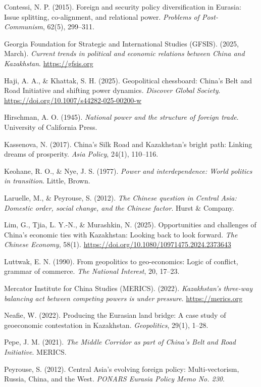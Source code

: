 \documentclass[12pt]{article}
\begin{document}
\begin{flushleft}
Contessi, N. P. (2015). Foreign and security policy diversification in Eurasia: Issue splitting, co-alignment, and relational power. \textit{Problems of Post-Communism}, 62(5), 299--311.

Georgia Foundation for Strategic and International Studies (GFSIS). (2025, March). \textit{Current trends in political and economic relations between China and Kazakhstan}. \url{https://gfsis.org}

Haji, A. A., \& Khattak, S. H. (2025). Geopolitical chessboard: China's Belt and Road Initiative and shifting power dynamics. \textit{Discover Global Society}. \url{https://doi.org/10.1007/s44282-025-00200-w}

Hirschman, A. O. (1945). \textit{National power and the structure of foreign trade}. University of California Press.

Kassenova, N. (2017). China's Silk Road and Kazakhstan's bright path: Linking dreams of prosperity. \textit{Asia Policy}, 24(1), 110--116.

Keohane, R. O., \& Nye, J. S. (1977). \textit{Power and interdependence: World politics in transition}. Little, Brown.

Laruelle, M., \& Peyrouse, S. (2012). \textit{The Chinese question in Central Asia: Domestic order, social change, and the Chinese factor}. Hurst \& Company.

Lim, G., Tjia, L. Y.-N., \& Murashkin, N. (2025). Opportunities and challenges of China's economic ties with Kazakhstan: Looking back to look forward. \textit{The Chinese Economy}, 58(1). \url{https://doi.org/10.1080/10971475.2024.2373643}

Luttwak, E. N. (1990). From geopolitics to geo-economics: Logic of conflict, grammar of commerce. \textit{The National Interest}, 20, 17--23.

Mercator Institute for China Studies (MERICS). (2022). \textit{Kazakhstan's three-way balancing act between competing powers is under pressure}. \url{https://merics.org}

Neafie, W. (2022). Producing the Eurasian land bridge: A case study of geoeconomic contestation in Kazakhstan. \textit{Geopolitics}, 29(1), 1--28.

Pepe, J. M. (2021). \textit{The Middle Corridor as part of China's Belt and Road Initiative}. MERICS.

Peyrouse, S. (2012). Central Asia's evolving foreign policy: Multi-vectorism, Russia, China, and the West. \textit{PONARS Eurasia Policy Memo No. 230}.


\end{flushleft}
\end{document}
